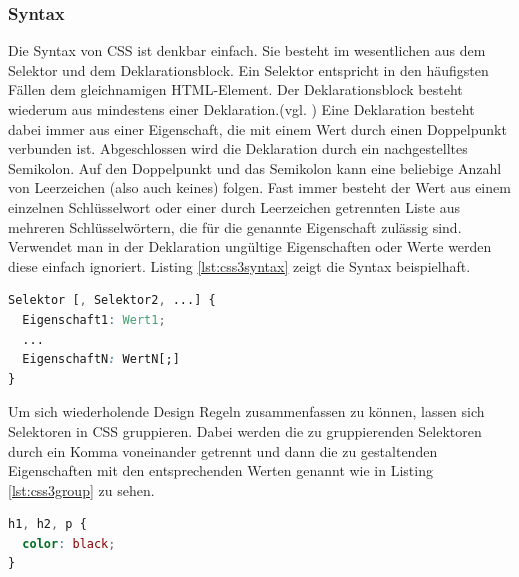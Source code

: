 \subsubsection{Syntax} Die Syntax von CSS ist denkbar einfach. Sie besteht im wesentlichen aus dem Selektor und dem Deklarationsblock. Ein Selektor entspricht in den häufigsten Fällen dem gleichnamigen HTML-Element. Der Deklarationsblock besteht wiederum aus mindestens einer Deklaration.(vgl. \cite[S.26]{MeyeCasc2005}) \glqq Eine Deklaration besteht dabei immer aus einer Eigenschaft, die mit einem Wert durch einen Doppelpunkt verbunden ist. Abgeschlossen wird die Deklaration durch ein nachgestelltes Semikolon. Auf den Doppelpunkt und das Semikolon kann eine beliebige Anzahl von Leerzeichen (also auch keines) folgen. Fast immer besteht der Wert aus einem einzelnen Schlüsselwort oder einer durch Leerzeichen getrennten Liste aus mehreren Schlüsselwörtern, die für die genannte Eigenschaft zulässig sind.\grqq{}\cite[S.28]{MeyeCasc2005} Verwendet man in der Deklaration ungültige Eigenschaften oder Werte werden diese einfach ignoriert. Listing \ref{lst:css3syntax} zeigt die Syntax beispielhaft.

\vspace{1em}
\begin{lstlisting}[language=CSS, caption=CSS3 Syntax Beispiel, label=lst:css3syntax]
Selektor [, Selektor2, ...] {
  Eigenschaft1: Wert1;
  ...
  EigenschaftN: WertN[;]
}
\end{lstlisting}

Um sich wiederholende Design Regeln zusammenfassen zu können, lassen sich Selektoren in CSS gruppieren. Dabei werden die zu gruppierenden Selektoren durch ein Komma voneinander getrennt und dann die zu gestaltenden Eigenschaften mit den entsprechenden Werten genannt wie in Listing \ref{lst:css3group} zu sehen.

\vspace{1em}
\begin{lstlisting}[language=CSS, caption=CSS3 Gruppierung, label=lst:css3group]
h1, h2, p {
  color: black;
}
\end{lstlisting}

